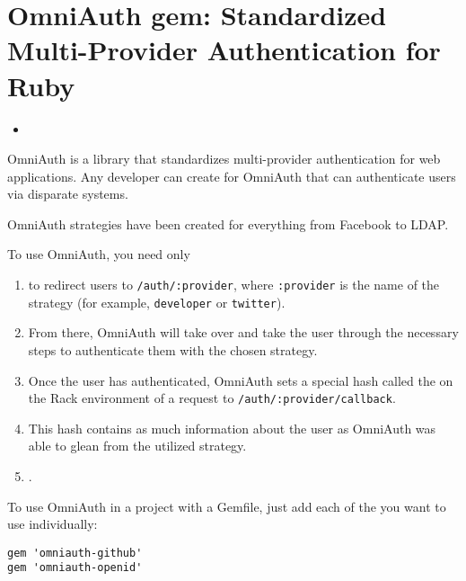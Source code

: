 \section{OmniAuth gem: Standardized Multi-Provider Authentication for Ruby}

\begin{itemize}
\item
{}
\end{itemize}

OmniAuth is a library that standardizes multi-provider authentication
for web applications. Any developer can create  for
OmniAuth that can
authenticate users via disparate systems. 

OmniAuth strategies have been created for everything from Facebook to LDAP.

To use OmniAuth, you need only 
\begin{enumerate}
\item
to redirect users to \verb|/auth/:provider|,
where \verb|:provider| is the name of the strategy 
(for example, \verb|developer| or \verb|twitter|). 

\item
From there, OmniAuth will take over and take the
user through the necessary steps to authenticate them with the chosen strategy.

\item
Once the user has authenticated, 
OmniAuth sets a special hash called the  
on the Rack environment of a request to \verb|/auth/:provider/callback|. 

\item
This hash
contains as much information about the user as OmniAuth was able to
glean from the utilized strategy. 

\item
{}. 
\end{enumerate}


To use OmniAuth in a project with a Gemfile, just add each of the
 you want to use individually:

\begin{verbatim}
gem 'omniauth-github'
gem 'omniauth-openid'
\end{verbatim}


